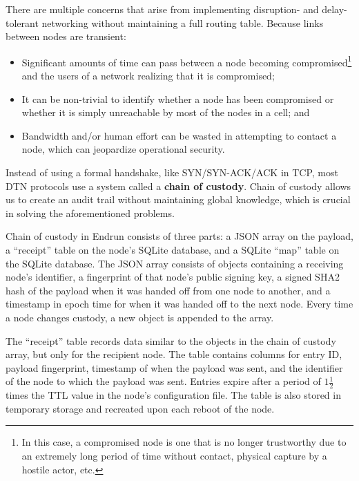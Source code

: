 \documentclass[12pt]{article}
\begin{document}
  There are multiple concerns that arise from implementing disruption- and delay-tolerant networking without maintaining a full routing table. Because links between nodes are transient:
  \begin{itemize}
  
      \item Significant amounts of time can pass between a node becoming compromised\footnote{In this case, a compromised node is one that is no longer trustworthy due to an extremely long period of time without contact, physical capture by a hostile actor, etc. } and the users of a network realizing that it is compromised;
      \item It can be non-trivial to identify whether a node has been compromised or whether it is simply unreachable by most of the nodes in a cell; and
      \item Bandwidth and/or human effort can be wasted in attempting to contact a node, which can jeopardize operational security.
      
      \end{itemize}
    
  Instead of using a formal handshake, like SYN/SYN-ACK/ACK in TCP, most DTN protocols use a system called a \textbf{chain of custody}. Chain of custody allows us to create an audit trail without maintaining global knowledge, which is crucial in solving the aforementioned problems.
  
  Chain of custody in Endrun consists of three parts: a JSON array on the payload, a ``receipt'' table on the node's SQLite database, and a SQLite ``map'' table on the SQLite database. The JSON array consists of objects containing a receiving node's identifier, a fingerprint of that node's public signing key, a signed SHA2 hash of the payload when it was handed off from one node to another, and a timestamp in epoch time for when it was handed off to the next node. Every time a node changes custody, a new object is appended to the array.
  
  The ``receipt'' table records data similar to the objects in the chain of custody array, but only for the recipient node. The table contains columns for entry ID, payload fingerprint, timestamp of when the payload was sent, and the identifier of the node to which the payload was sent. Entries expire after a period of $1\frac{1}{2}$ times the TTL value in the node's configuration file. The table is also stored in temporary storage and recreated upon each reboot of the node.
  
\end{document}
